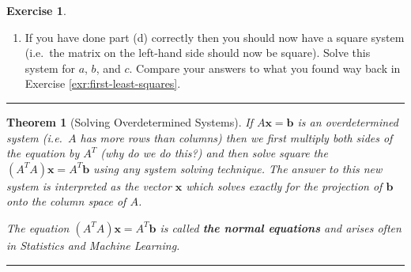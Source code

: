 \documentclass[
]{book}
\providecommand{\tightlist}{%
  \setlength{\itemsep}{0pt}\setlength{\parskip}{0pt}}
\newtheorem{theorem}{Theorem}[chapter]
\theoremstyle{definition}
\theoremstyle{definition}
\theoremstyle{definition}
\newtheorem{exercise}{Exercise}[chapter]
\theoremstyle{remark}
\begin{document}
\begin{exercise}
\begin{enumerate}
  \begin{itemize}
  \tightlist
  \item
    Projections are dot products
  \item
    Matrix multiplication is nothing but a bunch of dot products.
  \item
    The projections of \(\boldsymbol{b}\) onto the columns of \(A\) are the dot products of \(\boldsymbol{b}\) with each of the columns of \(A\).
  \item
    What matrix can we multiply both sides of the equation \(A \boldsymbol{x} = \boldsymbol{b}\) by in order for the right-hand side to become the projection that we want? (Now do the projection in Python)
  \end{itemize}
\item
  If you have done part (d) correctly then you should now have a square system (i.e.~the matrix on the left-hand side should now be square). Solve this system for \(a\), \(b\), and \(c\). Compare your answers to what you found way back in Exercise \ref{exr:first-least-squares}.
\end{enumerate}
\end{exercise}

\begin{center}\rule{0.5\linewidth}{0.5pt}\end{center}

\begin{theorem}[Solving Overdetermined Systems]
\protect\hypertarget{thm:overdetermined}{}{\label{thm:overdetermined} {} }If \(A \boldsymbol{x} = \boldsymbol{b}\) is an overdetermined system (i.e.~\(A\) has more rows than columns) then we first multiply both sides of the equation by \(A^T\) (why do we do this?) and then solve square the \((A^T A) \boldsymbol{x} = A^T \boldsymbol{b}\) using any system solving technique. The answer to this new system is interpreted as the vector \(\boldsymbol{x}\) which solves exactly for the projection of \(\boldsymbol{b}\) onto the column space of \(A\).

The equation \((A^T A) \boldsymbol{x} = A^T \boldsymbol{b}\) is called \textbf{the normal equations} and arises often in Statistics and Machine Learning.
\end{theorem}

\begin{center}\rule{0.5\linewidth}{0.5pt}\end{center}
\end{document}
